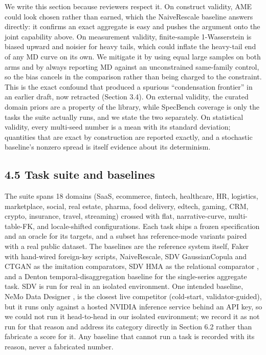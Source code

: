 We write this section because reviewers respect it. On construct
validity, AME could look chosen rather than earned, which the
NaiveRescale baseline answers directly: it confirms an exact aggregate
is easy and pushes the argument onto the joint capability above. On
measurement validity, finite-sample 1-Wasserstein is biased upward and
noisier for heavy tails, which could inflate the heavy-tail end of any
MD curve on its own. We mitigate it by using equal large samples on both
arms and by always reporting MD against an unconstrained same-family
control, so the bias cancels in the comparison rather than being charged
to the constraint. This is the exact confound that produced a spurious
``condensation frontier'' in an earlier draft, now retracted (Section
3.4). On external validity, the curated domain priors are a property of
the library, while SpecBench coverage is only the tasks the suite
actually runs, and we state the two separately. On statistical validity,
every multi-seed number is a mean with its standard deviation;
quantities that are exact by construction are reported exactly, and a
stochastic baseline's nonzero spread is itself evidence about its
determinism.

\hypertarget{task-suite-and-baselines}{%
\subsection{4.5 Task suite and
baselines}\label{task-suite-and-baselines}}

The suite spans 18 domains (SaaS, ecommerce, fintech, healthcare, HR,
logistics, marketplace, social, real estate, pharma, food delivery,
edtech, gaming, CRM, crypto, insurance, travel, streaming) crossed with
flat, narrative-curve, multi-table-FK, and locale-shifted
configurations. Each task ships a frozen specification and an oracle for
its targets, and a subset has reference-mode variants paired with a real
public dataset. The baselines are the reference system itself, Faker
with hand-wired foreign-key scripts, NaiveRescale, SDV GaussianCopula
and CTGAN as the imitation comparators, SDV HMA as the relational
comparator \cite{patki2016sdv,xu2019ctgan}, and a Denton
temporal-disaggregation baseline \cite{denton1971} for the single-series
aggregate task. SDV is run for real in an isolated environment. One
intended baseline, NeMo Data Designer \cite{nemo_data_designer}, is the
closest live competitor (cold-start, validator-guided), but it runs only
against a hosted NVIDIA inference service behind an API key, so we could
not run it head-to-head in our isolated environment; we record it as not
run for that reason and address its category directly in Section 6.2
rather than fabricate a score for it. Any baseline that cannot run a
task is recorded with its reason, never a fabricated number.

